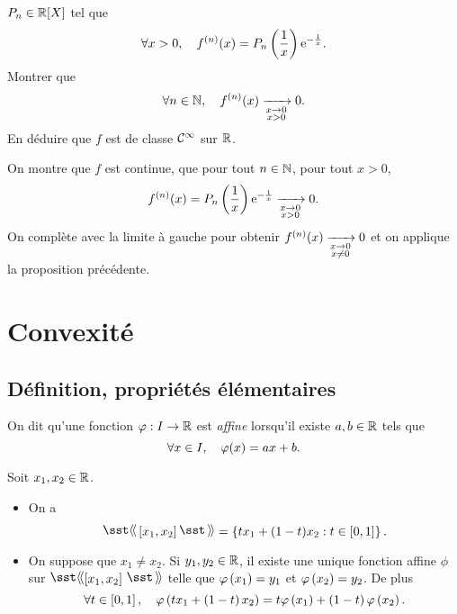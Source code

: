 \documentclass{magnoliaold}
\begin{document}
\begin{exos}
\begin{questions}
  $P_n\in\polyR$ tel que
  \[\forall x>0,\quad f^{(n)}(x)=P_n\left(\frac{1}{x}\right){\rm e}^{-\frac{1}{x}}.\]
\question Montrer que
  \[\forall n\in\mathbb{N},\quad f^{(n)}(x)\xrightarrow[ \substack{x\rightarrow 0 \\ x>0}]{}0.\]
\question En déduire que $f$ est de classe $\mathcal{C}^{\infty}$ sur $\mathbb{R}$.
  \end{questions}
  \begin{sol}
    On montre que $f$ est continue, que pour tout $n\in \mathbb{N}$, pour tout $x>0$, $$f^{(n)}(x)=P_n\left(\frac{1}{x}\right){\rm e}^{-\frac{1}{x}}\xrightarrow[ \substack{x\rightarrow 0 \\ x>0}]{}0.$$ On complète avec la limite à gauche pour obtenir $f^{(n)}(x)\xrightarrow[ \substack{x\rightarrow 0 \\ x\not=0}]{}0$ et on applique la proposition précédente.
    \end{sol}
\end{exos}






\section{Convexité}

\subsection{Définition, propriétés élémentaires}

On dit qu'une fonction $\varphi:I\to\mathbb{R}$ est \emph{affine} lorsqu'il existe $a,b\in\mathbb{R}$ tels que
\[\forall x\in I,\quad \varphi(x)=ax+b.\]

\begin{proposition}
Soit $x_1,x_2\in\mathbb{R}$.
\begin{itemize}
\item On a
\[\text{\og}\interf{x_1}{x_2}\text{\fg}=\ensim{tx_1+(1-t)x_2}{t\in[0,1]}.\]
\item On suppose que $x_1\neq x_2$. Si $y_1,y_2\in\mathbb{R}$, il existe
une unique fonction affine $\phi$ sur $\intergf{x_1}{x_2}$ telle que
$\varphi\left(x_1\right)=y_1$ et $\varphi\left(x_2\right)=y_2$. De plus
\[\forall t\in\left[0,1\right],\quad \varphi\left(tx_1+\left(1-t\right)x_2\right)=
  t \varphi\left(x_1\right)+\left(1-t\right)\varphi\left(x_2\right).\]
\end{itemize}
\end{proposition}
\end{document}

